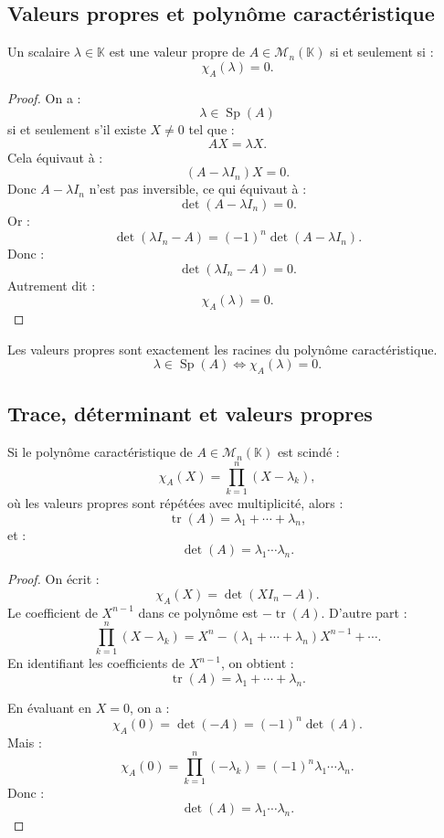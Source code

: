 \documentclass[11pt,a4paper]{article}
\newcommand{\K}{\mathbb K}
\newcommand{\M}{\mathcal M}
\newcommand{\tr}{\operatorname{tr}}
\newcommand{\Sp}{\operatorname{Sp}}
\begin{document}
\subsection{Valeurs propres et polynôme caractéristique}

\begin{theorembox}
Un scalaire \(\lambda\in\K\) est une valeur propre de \(A\in\M_n(\K)\) si et seulement si :
\[
\chi_A(\lambda)=0.
\]
\end{theorembox}

\begin{proof}
On a :
\[
\lambda\in\Sp(A)
\]
si et seulement s'il existe \(X\neq0\) tel que :
\[
AX=\lambda X.
\]
Cela équivaut à :
\[
(A-\lambda I_n)X=0.
\]
Donc \(A-\lambda I_n\) n'est pas inversible, ce qui équivaut à :
\[
\det(A-\lambda I_n)=0.
\]
Or :
\[
\det(\lambda I_n-A)=(-1)^n\det(A-\lambda I_n).
\]
Donc :
\[
\det(\lambda I_n-A)=0.
\]
Autrement dit :
\[
\chi_A(\lambda)=0.
\]
\end{proof}

\begin{retenirbox}
Les valeurs propres sont exactement les racines du polynôme caractéristique.
\[
\lambda\in\Sp(A)
\Longleftrightarrow
\chi_A(\lambda)=0.
\]
\end{retenirbox}

\subsection{Trace, déterminant et valeurs propres}

\begin{theorembox}
Si le polynôme caractéristique de \(A\in\M_n(\K)\) est scindé :
\[
\chi_A(X)=\prod_{k=1}^n (X-\lambda_k),
\]
où les valeurs propres sont répétées avec multiplicité, alors :
\[
\tr(A)=\lambda_1+\cdots+\lambda_n,
\]
et :
\[
\det(A)=\lambda_1\cdots\lambda_n.
\]
\end{theorembox}

\begin{proof}
On écrit :
\[
\chi_A(X)=\det(XI_n-A).
\]
Le coefficient de \(X^{n-1}\) dans ce polynôme est \(-\tr(A)\).  
D'autre part :
\[
\prod_{k=1}^n(X-\lambda_k)
=
X^n-(\lambda_1+\cdots+\lambda_n)X^{n-1}+\cdots.
\]
En identifiant les coefficients de \(X^{n-1}\), on obtient :
\[
\tr(A)=\lambda_1+\cdots+\lambda_n.
\]

En évaluant en \(X=0\), on a :
\[
\chi_A(0)=\det(-A)=(-1)^n\det(A).
\]
Mais :
\[
\chi_A(0)=\prod_{k=1}^n(-\lambda_k)=(-1)^n\lambda_1\cdots\lambda_n.
\]
Donc :
\[
\det(A)=\lambda_1\cdots\lambda_n.
\]
\end{proof}
\end{document}

